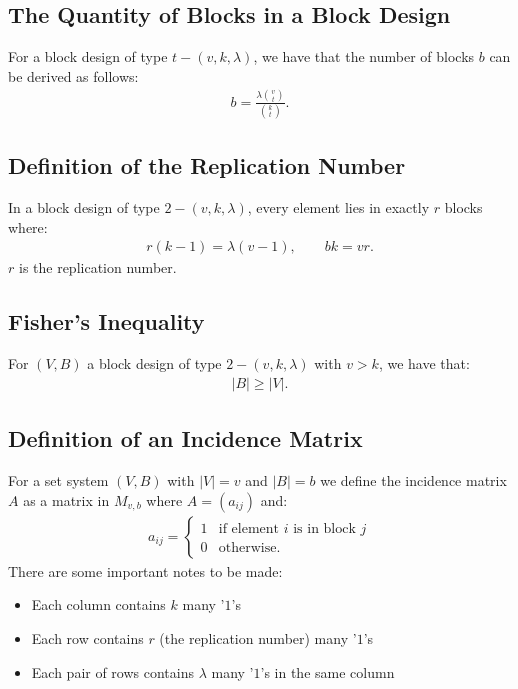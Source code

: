 \documentclass[a4paper, 12pt, twoside]{article}
\begin{document}
\subsection{The Quantity of Blocks in a Block Design}

For a block design of type $t-(v,k,\lambda)$, we have that the number
of blocks $b$ can be derived as follows: \begin{gather*}
  b = \frac{\lambda{v \choose t}}{{k \choose t}}.
\end{gather*}

\subsection{Definition of the Replication Number}

In a block design of type $2-(v,k,\lambda)$, every element lies in
exactly $r$ blocks where: \begin{gather*}
  r(k - 1) = \lambda(v - 1), \qquad bk = vr.
\end{gather*} $r$ is the replication number.

\subsection{Fisher's Inequality}

For $(V, B)$ a block design of type $2 - (v, k, \lambda)$ with $v > k$,
we have that: \begin{gather*}
  |B| \geq |V|.
\end{gather*}

\subsection{Definition of an Incidence Matrix}

For a set system $(V, B)$ with $|V| = v$ and $|B| = b$ we define the
incidence matrix $A$ as a matrix in $M_{v, b}$ where $A = (a_{ij})$ 
and: \begin{gather*}
  a_{ij} = \begin{cases}
    1 & \text{if element } i \text{ is in block } j \\
    0 & \text{otherwise}.
  \end{cases}
\end{gather*} There are some important notes to be made: \begin{itemize}
  \item Each column contains $k$ many '$1$'s
  \item Each row contains $r$ (the replication number) many '$1$'s
  \item Each pair of rows contains $\lambda$ many '$1$'s in the same
  column
\end{itemize}
\end{document}

